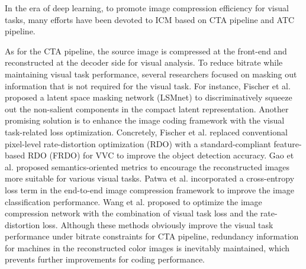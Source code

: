 \textcolor[rgb]{0,0,0}{In the era of deep learning, to promote image compression efficiency for visual tasks, many efforts have been devoted to ICM based on CTA pipeline and ATC pipeline.}

As for the CTA pipeline, the source image is compressed at the front-end and reconstructed at the decoder side for visual analysis. \textcolor[rgb]{0,0,0}{To reduce bitrate while maintaining visual task performance}, several researchers focused on masking out information that is not required for the visual task. For instance, Fischer et al. \cite{2022-TCSVT-LSM} proposed a latent space masking network (LSMnet) to discriminatively squeeze out the non-salient components in the compact latent representation. Another promising solution is to enhance the image coding framework with the visual task-related loss optimization. Concretely, Fischer et al. \cite{2022-MMSP-FRDO} replaced conventional pixel-level rate-distortion optimization (RDO) with a standard-compliant feature-based RDO (FRDO) for VVC to improve the object detection accuracy. \textcolor[rgb]{0,0,0}{Gao et al. \cite{2023-TMM-Gao} proposed semantics-oriented metrics to encourage the reconstructed images more suitable for various visual tasks.} Patwa et al. \cite{2020-ICIP-SPIC} incorporated a cross-entropy loss term in the end-to-end image compression framework to improve the image classification performance.  Wang et al. \cite{2021-CAS-Wang} proposed to optimize the image compression network with the combination of visual task loss and the rate-distortion loss. \textcolor[rgb]{0,0,0}{Although these methods obviously improve the visual task performance under bitrate constraints for CTA pipeline, redundancy information for machines in the reconstructed color images is inevitably maintained, which prevents further improvements for coding performance.}




